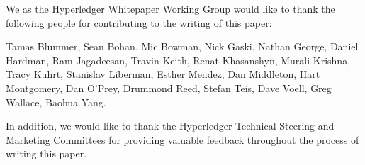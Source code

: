 We as the Hyperledger Whitepaper Working Group would like to thank the following people for contributing to the writing of this paper:

Tamas Blummer, Sean Bohan, Mic Bowman, Nick Gaski, Nathan George, Daniel Hardman, Ram Jagadeesan, Travin Keith, Renat Khasanshyn, Murali Krishna, Tracy Kuhrt, Stanislav Liberman, Esther Mendez, Dan Middleton, Hart Montgomery, Dan O'Prey, Drummond Reed, Stefan Teis, Dave Voell, Greg Wallace, Baohua Yang.

In addition, we would like to thank the Hyperledger Technical Steering and Marketing Committees for providing valuable feedback throughout the process of writing this paper.
